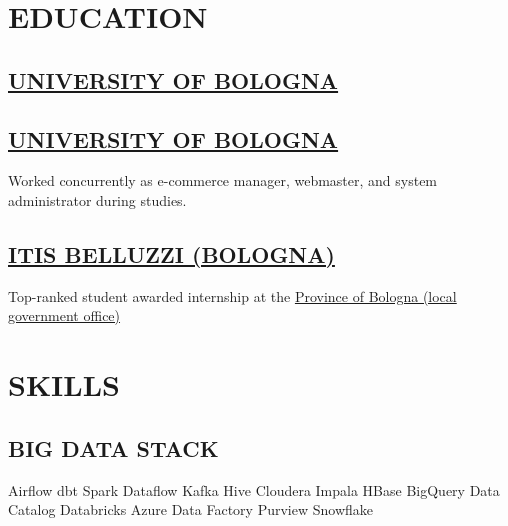 \documentclass[]{deedy-resume-cv}
\begin{document}
\hfill
\begin{minipage}[t]{0.35\textwidth}

\section{EDUCATION}

\subsection{\href{https://www.unibo.it/}{UNIVERSITY OF BOLOGNA}}

\sectionsep
\subsection{\href{https://www.unibo.it/}{UNIVERSITY OF BOLOGNA}}
Worked concurrently as e-commerce manager, webmaster, and system administrator during studies.

\sectionsep
\subsection{\href{https://www.belluzzifioravanti.it/}{ITIS BELLUZZI (BOLOGNA)}}
Top-ranked student awarded internship at the \href{https://www.cittametropolitana.bo.it/}{Province of Bologna (local government office)}

\section{SKILLS}

\subsection{BIG DATA STACK}
Airflow \textbullet{} dbt \textbullet{} Spark \textbullet{} Dataflow \textbullet{} Kafka \textbullet{} Hive \textbullet{} Cloudera Impala \textbullet{} HBase \textbullet{} BigQuery \textbullet{} Data Catalog \textbullet{} Databricks \textbullet{} Azure Data Factory \textbullet{} Purview \textbullet{} Snowflake


\end{minipage}
\end{document}
